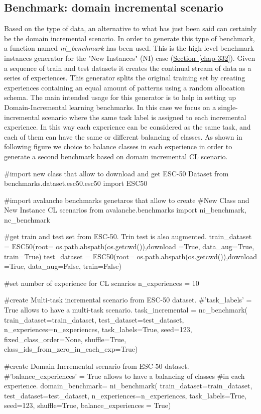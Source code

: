 \documentclass[english, LaM, oneside]{sapthesis}%
\begin{document}
\subsection{Benchmark: domain incremental scenario}
Based on the type of data, an alternative to what has just been said can certainly be the domain incremental scenario. In order to generate this type of benchmark, a function named \textit{ni\_benchmark} has been used. This is the high-level benchmark instances generator for the "New Instances" (NI) case (\hyperref[chap-332]{Section~\ref*{chap-332}}). Given a sequence of train and test datasets it creates the continual stream of data as a series of experiences. This generator splits the original training set by creating experiences containing an equal amount of patterns using a random allocation schema. The main intended usage for this generator is to help in setting up Domain-Incremental learning benchmarks. In this case we focus on a single-incremental scenario where the same task label is assigned to each incremental experience. In this way each experience can be considered as the same task, and each of them can have the same or different balancing of classes. As shown in following figure we choice to balance classes in each experience in order to generate a second benchmark based on domain incremental CL scenario.
\begin{pythoncode}
#import new class that allow to download and get ESC-50 Dataset
from benchmarks.dataset.esc50.esc50 import ESC50

#import avalanche benchmarks genetaros that allow to create 
#New Class and New Instance CL scenarios
from avalanche.benchmarks import ni_benchmark, nc_benchmark

#get train and test set from ESC-50. Trin test is also augmented.
train_dataset = ESC50(root= os.path.abspath(os.getcwd()),download =True, 
data_aug=True, train=True)
test_dataset = ESC50(root= os.path.abspath(os.getcwd()),download =True, 
data_aug=False, train=False)

#set number of experience for CL scnarios
n_experiences = 10

#create Multi-task incremental scenario from ESC-50 dataset. 
#'task_labels' = True allows to have a multi-task scenario.
task_incremental = nc_benchmark(
                        train_dataset=train_dataset,
                        test_dataset=test_dataset,
                        n_experiences=n_experiences,
                        task_labels=True,
                        seed=123,
                        fixed_class_order=None,
                        shuffle=True,
                        class_ids_from_zero_in_each_exp=True) 

#create Domain Incremental scenario from ESC-50 dataset. 
#'balance_experiences' = True allows to have a balancing of classes 
#in each experience.                        
domain_benchmark=  ni_benchmark(
                        train_dataset=train_dataset,
                        test_dataset=test_dataset,
                        n_experiences=n_experiences,
                        task_labels=True,
                        seed=123,
                        shuffle=True,
                        balance_experiences = True)
    
\end{pythoncode}
\end{document}
